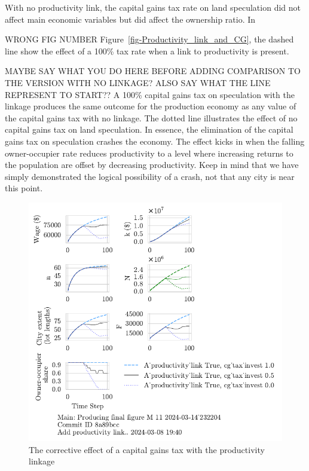 With no productivity link, the capital gains tax rate on land speculation did not affect main economic variables but did affect the ownership ratio. In {{\color{red} WRONG FIG NUMBER}  Figure~\ref{fig-Productivity_link_and_CG}, the dashed line show the effect of a 100\%  tax rate when a link to productivity is present. 

{\color{red} MAYBE SAY WHAT YOU DO HERE BEFORE ADDING COMPARISON TO THE VERSION WITH NO LINKAGE? ALSO SAY WHAT THE LINE REPRESENT TO START?? A 100\% capital gains tax on speculation with the linkage produces the same outcome for the production economy as any value of the capital gains tax with no linkage. The dotted line illustrates the effect of no capital gains tax on land speculation. In essence, the elimination of the capital gains tax on speculation crashes the economy. The effect kicks in when the falling owner-occupier rate reduces productivity to a level where increasing returns to the population are offset by decreasing productivity. Keep in mind that we have simply demonstrated the logical possibility of a crash, not that any city is near this point. }

\begin{figure}[h!tb]\label{fig-Productivity_link_and_CG}
    \centering
     \includegraphics[scale=1, trim=.25cm 2cm .25cm .25cm, clip]{fig/With-productivity_linkcg_tax_invest-232204.pdf}
    \caption{The corrective effect of a capital gains tax with the productivity linkage}
    \label{fig:Productivity_link_and_CG}
\end{figure}

}

